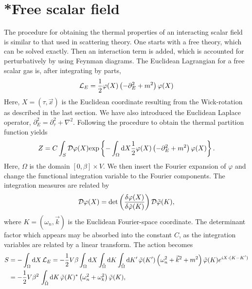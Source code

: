 \section{*Free scalar field}
\label{section:free scalar field}

The procedure for obtaining the thermal properties of an interacting scalar field is similar to that used in scattering theory.
One starts with a free theory, which can be solved exactly.
Then an interaction term is added, which is accounted for perturbatively by using Feynman diagrams.
The Euclidean Lagrangian for a free scalar gas is, after integrating by parts,
%
\begin{equation}
    \mathcal{L}_E = \frac{1}{2} \varphi(X) \left( -\partial_E^2 + m^2 \right) \varphi(X)
\end{equation}
%
Here, $X = (\tau, \vec x)$ is the Euclidean coordinate resulting from the Wick-rotation as described in the last section.
We have also introduced the Euclidean Laplace operator, $\partial_E^2 = \partial_\tau^2 + \nabla^2$.
Following the procedure to obtain the thermal partition function yields
%
\begin{equation}
    Z = C \int_S \mathcal D \varphi(X) 
    \text{exp} \left\{ 
        - \int_\Omega \text{d} X \frac{1}{2} 
        \varphi(X) \left( -\partial_E^2 + m^2 \right) \varphi(X)
     \right\}.
\end{equation}
%
Here, $\Omega$ is the domain $[0, \beta] \times V$.
We then insert the Fourier expansion of $\varphi$ and change the functional integration variable to the Fourier components.
The integration measures are related by
\begin{equation*}
    \mathcal D \varphi(X) = \det\left(\frac{\delta \varphi(X)}{\delta \tilde \varphi(K)}\right) \mathcal D\tilde \varphi(K),
\end{equation*}
where $K = (\omega_n, \vec k)$ is the Euclidean Fourier-space coordinate.
The determinant factor which appears may be absorbed into the constant $C$, as the integration variables are related by a linear transform.
The action becomes
%
\begin{align*}
    S & = - \int_\Omega \text{d} X\, \mathcal{L}_E 
    = - \frac{1}{2} V \beta \int_\Omega \text{d} X \int_{\tilde \Omega} \text{d} K \int_{\tilde \Omega} \text{d} K' \,
    \tilde \varphi(K') 
    \left(
        \omega_n^2 + \vec k^2 + m^2
    \right)
    \tilde \varphi(K)
    e^{iX\cdot(K - K')} \\
    & = - \frac{1}{2} V \beta^2 \, \int_{\tilde \Omega} \text{d} K \,
    \tilde \varphi(K)^*
    \left(
        \omega_n^2 + \omega_k^2
    \right)
    \tilde \varphi(K),
\end{align*}
